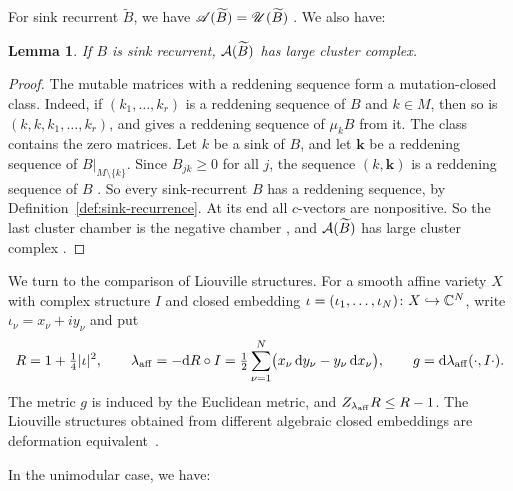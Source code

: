 \documentclass[12pt, letter]{amsart}
\newtheorem{lemma}[dummy]{Lemma}
\theoremstyle{definition}
\begin{document}
For sink recurrent $\widetilde B$, we have $\mathscr{A}(\widetilde B)=\mathscr{U}(\widetilde B)$  \cite[Proposition~3.7]{GLSB}.  We also have:

\begin{lemma}\label{lem:sink-recurrent-large}
If $B$ is sink recurrent,  $\mathcal{A}(\widetilde B)$ has large cluster complex.
\end{lemma}

\begin{proof}
The mutable matrices with a reddening sequence form a mutation-closed class.
Indeed, if $(k_1,\dots,k_r)$ is a reddening sequence of $B$ and $k\in M$, then so is $(k,k,k_1,\dots,k_r)$, and \cite[Theorem~2.2.4]{BHIT} gives a reddening sequence of $\mu_kB$ from it.
The class contains the zero matrices.
Let $k$ be a sink of $B$, and let $\mathbf k$ be a reddening sequence of $B|_{M\setminus\{k\}}$.
Since $B_{jk}\ge0$ for all $j$, the sequence $(k,\mathbf k)$ is a reddening sequence of $B$ \cite[Theorem~4.5 and Remark~4.6]{CL}.
So every sink-recurrent $B$ has a reddening sequence, by Definition~\ref{def:sink-recurrence}.
At its end all $c$-vectors are nonpositive.
So the last cluster chamber is the negative chamber \cite[Lemma~5.12]{GHKK}, and $\mathcal{A}(\widetilde B)$ has large cluster complex \cite[Lemma~8.29]{GHKK}.
\end{proof}


We turn to the comparison of Liouville structures.  For a smooth affine variety $X$ with complex structure $I$ and closed embedding $\iota=(\iota_1,\dots,\iota_N)\colon X\hookrightarrow\mathbb{C}^N$, write $\iota_\nu=x_\nu+iy_\nu$ and put
\[
 R=1+\tfrac14\lvert \iota\rvert^2,\qquad
 \lambda_{\mathrm{aff}}=-\mathrm{d} R\circ I=\tfrac12\sum_{\nu=1}^N\bigl(x_\nu\,\mathrm{d} y_\nu-y_\nu\,\mathrm{d} x_\nu\bigr),\qquad
 g=\mathrm{d}\lambda_{\mathrm{aff}}(\cdot,I\cdot).
\]
The metric $g$ is induced by the Euclidean metric, and $Z_{\lambda_{\mathrm{aff}}}R\le R-1$.
The Liouville structures obtained from different algebraic closed embeddings are deformation equivalent~\cite[Lemma~5.18]{McLean-growth}.

In the unimodular case, we have: 
\end{document}
